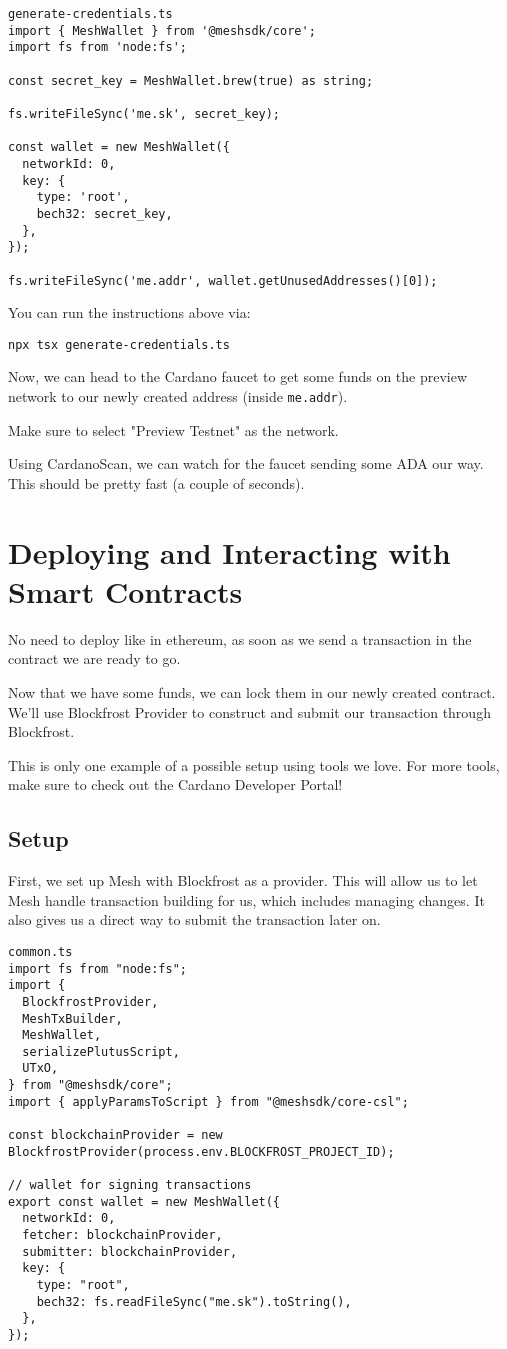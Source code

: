 \begin{verbatim}
generate-credentials.ts
import { MeshWallet } from '@meshsdk/core';
import fs from 'node:fs';
 
const secret_key = MeshWallet.brew(true) as string;
 
fs.writeFileSync('me.sk', secret_key);
 
const wallet = new MeshWallet({
  networkId: 0,
  key: {
    type: 'root',
    bech32: secret_key,
  },
});
 
fs.writeFileSync('me.addr', wallet.getUnusedAddresses()[0]);
\end{verbatim}

You can run the instructions above via:

\begin{verbatim}
npx tsx generate-credentials.ts
\end{verbatim}

Now, we can head to the Cardano faucet to get some funds on the preview network to our newly created address (inside \texttt{me.addr}).

Make sure to select "Preview Testnet" as the network.

Using CardanoScan, we can watch for the faucet sending some ADA our way. This should be pretty fast (a couple of seconds).

\section{Deploying and Interacting with Smart Contracts}
No need to deploy like in ethereum, as soon as we send a transaction in the contract we are ready to go.

Now that we have some funds, we can lock them in our newly created contract. We'll use Blockfrost Provider to construct and submit our transaction through Blockfrost.

This is only one example of a possible setup using tools we love. For more tools, make sure to check out the Cardano Developer Portal!

\subsection{Setup}
First, we set up Mesh with Blockfrost as a provider. This will allow us to let Mesh handle transaction building for us, which includes managing changes. It also gives us a direct way to submit the transaction later on.

\begin{verbatim}
common.ts
import fs from "node:fs";
import {
  BlockfrostProvider,
  MeshTxBuilder,
  MeshWallet,
  serializePlutusScript,
  UTxO,
} from "@meshsdk/core";
import { applyParamsToScript } from "@meshsdk/core-csl";
 
const blockchainProvider = new BlockfrostProvider(process.env.BLOCKFROST_PROJECT_ID);
 
// wallet for signing transactions
export const wallet = new MeshWallet({
  networkId: 0,
  fetcher: blockchainProvider,
  submitter: blockchainProvider,
  key: {
    type: "root",
    bech32: fs.readFileSync("me.sk").toString(),
  },
});
\end{verbatim}

